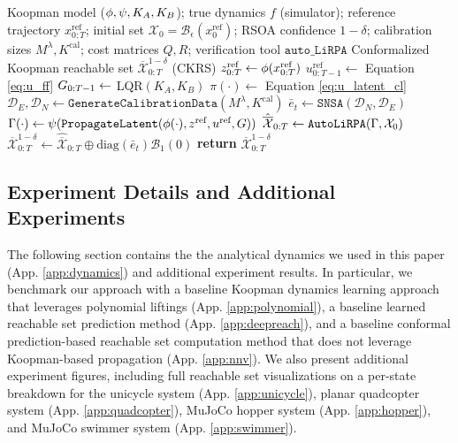 \begin{algorithm}[]

\caption{Online Conformalized Koopman Reachable Set (CKRS)}
\label{alg:online_ckrs}
\begin{algorithmic}[1]
 \Require Koopman model ($\phi, \psi, K_{A}, K_{B}$); true dynamics $f$ (simulator); reference trajectory $x^{\text{ref}}_{0:T}$; initial set $\mathcal{X}_0 = \mathcal{B}_\epsilon(x_0^{\text{ref}})$; RSOA confidence $1-\delta$; calibration sizes $M^{\lambda}, K^{\text{cal}}$; cost matrices $Q, R$; verification tool $\texttt{auto\_LiRPA}$
 \Ensure Conformalized Koopman reachable set $\overline{\mathcal{X}}^{1-\delta}_{0:T}$ (CKRS)
 \Statex {}
 \State $z^{\text{ref}}_{0:T} \gets \phi(x^{\text{ref}}_{0:T})$ 
 \State $u^{\text{ref}}_{0:T-1} \gets$ Equation \eqref{eq:u_ff} 
 \State $G_{0:T-1} \gets$ \textrm{LQR}$(K_A, K_B)$ 
 \State $\pi(\cdot) \gets$ Equation \eqref{eq:u_latent_cl} 
 \Statex {}
 \State $\mathcal{D}_E, \mathcal{D}_N \gets \texttt{GenerateCalibrationData}(M^{\lambda}, K^{\text{cal}})$
 \State $\bar e_t \gets \texttt{SNSA}(\mathcal{D}_N, \mathcal{D}_E)$
 \Statex {}
 \State $\Gamma(\cdot) \gets \psi(\texttt{PropagateLatent}(\phi(\cdot), z^{\text{ref}}, u^{\text{ref}}, G))$ 
 \State $\hat{\overline{\mathcal{X}}}_{0:T} \gets \texttt{AutoLiRPA}(\Gamma, \mathcal{X}_0)$ 
 \State $\overline{\mathcal{X}}^{1-\delta}_{0:T} \gets \hat{\overline{\mathcal{X}}}_{0:T} \oplus \textrm{diag}(\bar e_t) \mathcal{B}_1(0)$ 
 \State \textbf{return} $\overline{\mathcal{X}}^{1-\delta}_{0:T}$
\end{algorithmic}
\end{algorithm}


\subsection{Experiment Details and Additional Experiments}\label{app:parameters}

The following section contains the the analytical dynamics we used in this paper (App. \ref{app:dynamics}) and additional experiment results. In particular, we benchmark our approach with a baseline Koopman dynamics learning approach that leverages polynomial liftings (App. \ref{app:polynomial}), a baseline learned reachable set prediction method (App. \ref{app:deepreach}), and a baseline conformal prediction-based reachable set computation method that does not leverage Koopman-based propagation (App. \ref{app:nnv}). We also present additional experiment figures, including full reachable set visualizations on a per-state breakdown for the unicycle system (App. \ref{app:unicycle}), planar quadcopter system (App. \ref{app:quadcopter}), MuJoCo hopper system (App. \ref{app:hopper}), and MuJoCo swimmer system (App. \ref{app:swimmer}).


